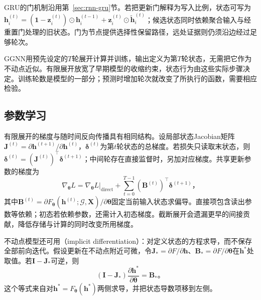 GRU的门机制沿用第~\ref{sec:rnn-gru}节。若把更新门解释为写入比例，状态可写为$\bm{h}_i^{(t)}=(\bm{1}-\bm{z}_i^{(t)})\odot\bm{h}_i^{(t-1)}+\bm{z}_i^{(t)}\odot\widetilde{\bm{h}}_i^{(t)}$；候选状态同时依赖聚合输入与经重置门处理的旧状态。门为节点提供选择性保留路径，远处证据则仍须沿边经过足够轮次。

GGNN用预先设定的$T$轮展开计算并训练，输出定义为第$T$轮状态，无需把它作为不动点近似。有限展开放宽了早期模型的收缩约束，状态行为由这些实际步骤决定。训练轮数是模型的一部分；预测时增加轮次就改变了所执行的函数，需要相应检验。

\subsection{参数学习}
\label{sec:gnn-recurrent-learning}

有限展开的梯度与随时间反向传播具有相同结构。设局部状态Jacobian矩阵$\bm{J}^{(t)}=\partial\bm{h}^{(t+1)}/\partial\bm{h}^{(t)}$，$\bm{\delta}^{(t)}$为第$t$轮状态的总梯度。若损失只读取末状态，则$\bm{\delta}^{(t)}=(\bm{J}^{(t)})^{\top}\bm{\delta}^{(t+1)}$；中间轮存在直接监督时，另加对应梯度。共享更新参数的梯度为
\begin{equation}
  \nabla_{\bm{\theta}}L
    =\left.\nabla_{\bm{\theta}}L\right|_{\mathrm{direct}}
      +\sum_{t=0}^{T-1}(\bm{B}^{(t)})^{\top}\bm{\delta}^{(t+1)}\text{，}
  \label{eq:gnn-recurrent-gradient}
\end{equation}
其中$\bm{B}^{(t)}=\partial F_{\bm{\theta}}(\bm{h}^{(t)};\mathcal{G},\bm{X})/\partial\bm{\theta}$固定当前输入状态求偏导。直接项包含读出参数等依赖；初态若依赖参数，还需计入初态梯度。截断展开会遗漏更早的间接贡献，降低存储与计算的同时改变所用梯度。

不动点模型还可用（implicit differentiation）：对定义状态的方程求导，而不保存全部前向迭代。假设更新在不动点附近可微，令$\bm{J}_*=\partial F/\partial\bm{h}$、$\bm{B}_*=\partial F/\partial\bm{\theta}$在$\bm{h}^*$处取值。若$\bm{I}-\bm{J}_*$可逆，则
\begin{equation}
  (\bm{I}-\bm{J}_*)\frac{\partial\bm{h}^*}{\partial\bm{\theta}}
    =\bm{B}_*\text{。}
  \label{eq:gnn-implicit-state-gradient}
\end{equation}
这个等式来自对$\bm{h}^*=F_{\bm{\theta}}(\bm{h}^*)$两侧求导，并把状态导数项移到左侧。

